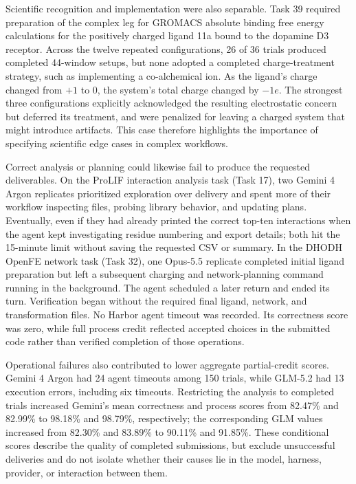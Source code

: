 \documentclass[twoside,twocolumn,9pt]{article}
\begin{document}
Scientific recognition and implementation were also separable. Task 39 required preparation of the complex leg for GROMACS absolute binding free energy calculations for the positively charged ligand 11a bound to the dopamine D3 receptor. Across the twelve repeated configurations, 26 of 36 trials produced completed 44-window setups, but none adopted a completed charge-treatment strategy, such as implementing a co-alchemical ion. As the ligand's charge changed from $+1$ to $0$, the system's total charge changed by $-1e$. The strongest three configurations explicitly acknowledged the resulting electrostatic concern but deferred its treatment, and were penalized for leaving a charged system that might introduce artifacts. This case therefore highlights the importance of specifying scientific edge cases in complex workflows. 

Correct analysis or planning could likewise fail to produce the requested deliverables. On the ProLIF interaction analysis task (Task 17), two Gemini 4 Argon replicates prioritized exploration over delivery and spent more of their workflow inspecting files, probing library behavior, and updating plans. Eventually, even if they had already printed the correct top-ten interactions when the agent kept investigating residue numbering and export details; both hit the 15-minute limit without saving the requested CSV or summary. In the DHODH OpenFE network task (Task 32), one Opus-5.5 replicate completed initial ligand preparation but left a subsequent charging and network-planning command running in the background. The agent scheduled a later return and ended its turn. Verification began without the required final ligand, network, and transformation files. No Harbor agent timeout was recorded. Its correctness score was zero, while full process credit reflected accepted choices in the submitted code rather than verified completion of those operations. 

Operational failures also contributed to lower aggregate
partial-credit scores. Gemini 4 Argon had 24 agent timeouts
among 150 trials, while GLM-5.2 had 13 execution errors, including six timeouts. Restricting the analysis to completed trials increased Gemini’s mean correctness and process scores from
82.47\% and 82.99\% to 98.18\% and 98.79\%, respectively; the
corresponding GLM values increased from 82.30\% and 83.89\%
to 90.11\% and 91.85\%. These conditional scores describe the
quality of completed submissions, but exclude unsuccessful deliveries and do not isolate whether their causes lie in the model,
harness, provider, or interaction between them.
\end{document}

